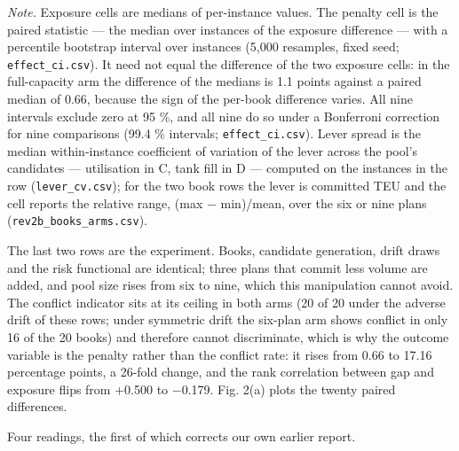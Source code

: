 \documentclass[preprint,12pt,letterpaper]{elsarticle}
\theoremstyle{definition}
\theoremstyle{plain}
\begin{document}
\textit{Note.} Exposure cells are medians of per-instance values. The penalty cell is the paired statistic --- the median over instances of the exposure difference --- with a percentile bootstrap interval over instances (5,000 resamples, fixed seed; \texttt{effect\_\allowbreak{}ci.\allowbreak{}csv}). It need not equal the difference of the two exposure cells: in the full-capacity arm the difference of the medians is 1.1 points against a paired median of 0.66, because the sign of the per-book difference varies. All nine intervals exclude zero at 95 \%, and all nine do so under a Bonferroni correction for nine comparisons (99.4 \% intervals; \texttt{effect\_\allowbreak{}ci.\allowbreak{}csv}). Lever spread is the median within-instance coefficient of variation of the lever across the pool's candidates --- utilisation in C, tank fill in D --- computed on the instances in the row (\texttt{lever\_\allowbreak{}cv.\allowbreak{}csv}); for the two book rows the lever is committed TEU and the cell reports the relative range, (max $-$ min)/mean, over the six or nine plans (\texttt{rev2b\_\allowbreak{}books\_\allowbreak{}arms.\allowbreak{}csv}).

The last two rows are the experiment. Books, candidate generation, drift draws and the risk functional are identical; three plans that commit less volume are added, and pool size rises from six to nine, which this manipulation cannot avoid. The conflict indicator sits at its ceiling in both arms (20 of 20 under the adverse drift of these rows; under symmetric drift the six-plan arm shows conflict in only 16 of the 20 books) and therefore cannot discriminate, which is why the outcome variable is the penalty rather than the conflict rate: it rises from 0.66 to 17.16 percentage points, a 26-fold change, and the rank correlation between gap and exposure flips from +0.500 to $-$0.179. Fig. 2(a) plots the twenty paired differences.

Four readings, the first of which corrects our own earlier report.
\end{document}
